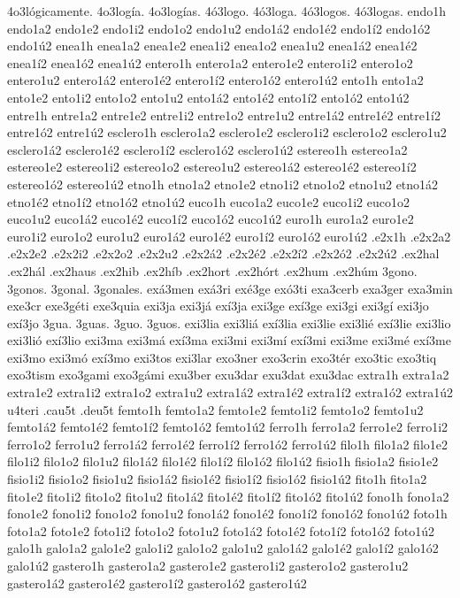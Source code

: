 {4o3lógicamente.
4o3logía.
4o3logías.
4ó3logo.
4ó3loga.
4ó3logos.
4ó3logas.
endo1h
endo1a2 endo1e2 endo1i2 endo1o2 endo1u2
endo1á2 endo1é2 endo1í2 endo1ó2 endo1ú2
enea1h
enea1a2 enea1e2 enea1i2 enea1o2 enea1u2
enea1á2 enea1é2 enea1í2 enea1ó2 enea1ú2
entero1h
entero1a2 entero1e2 entero1i2 entero1o2 entero1u2
entero1á2 entero1é2 entero1í2 entero1ó2 entero1ú2
ento1h
ento1a2 ento1e2 ento1i2 ento1o2 ento1u2
ento1á2 ento1é2 ento1í2 ento1ó2 ento1ú2
entre1h
entre1a2 entre1e2 entre1i2 entre1o2 entre1u2
entre1á2 entre1é2 entre1í2 entre1ó2 entre1ú2
esclero1h
esclero1a2 esclero1e2 esclero1i2 esclero1o2 esclero1u2
esclero1á2 esclero1é2 esclero1í2 esclero1ó2 esclero1ú2
estereo1h
estereo1a2 estereo1e2 estereo1i2 estereo1o2 estereo1u2
estereo1á2 estereo1é2 estereo1í2 estereo1ó2 estereo1ú2
etno1h
etno1a2 etno1e2 etno1i2 etno1o2 etno1u2
etno1á2 etno1é2 etno1í2 etno1ó2 etno1ú2
euco1h
euco1a2 euco1e2 euco1i2 euco1o2 euco1u2
euco1á2 euco1é2 euco1í2 euco1ó2 euco1ú2
euro1h
euro1a2 euro1e2 euro1i2 euro1o2 euro1u2
euro1á2 euro1é2 euro1í2 euro1ó2 euro1ú2
.e2x1h
.e2x2a2 .e2x2e2 .e2x2i2 .e2x2o2 .e2x2u2
.e2x2á2 .e2x2é2 .e2x2í2 .e2x2ó2 .e2x2ú2
.ex2hal
.ex2hál
.ex2haus
.ex2hib
.ex2híb
.ex2hort
.ex2hórt
.ex2hum
.ex2húm
3gono.
3gonos.
3gonal.
3gonales.
exá3men
exá3ri
exé3ge
exó3ti
exa3cerb
exa3ger
exa3min
exe3cr
exe3géti
exe3quia
exi3ja
exi3já
exí3ja
exi3ge
exí3ge
exi3gi
exi3gí
exi3jo
exí3jo
3gua.
3guas.
3guo.
3guos.
exi3lia
exi3liá
exí3lia
exi3lie
exi3lié
exí3lie
exi3lio
exi3lió
exí3lio
exi3ma
exi3má
exí3ma
exi3mi
exi3mí
exí3mi
exi3me
exi3mé
exí3me
exi3mo
exi3mó
exí3mo
exi3tos
exi3lar
exo3ner
exo3crin
exo3tér
exo3tic
exo3tiq
exo3tism
exo3gami
exo3gámi
exu3ber
exu3dar
exu3dat
exu3dac
extra1h
extra1a2 extra1e2 extra1i2 extra1o2 extra1u2
extra1á2 extra1é2 extra1í2 extra1ó2 extra1ú2
u4teri
.cau5t
.deu5t
femto1h
femto1a2 femto1e2 femto1i2 femto1o2 femto1u2
femto1á2 femto1é2 femto1í2 femto1ó2 femto1ú2
ferro1h
ferro1a2 ferro1e2 ferro1i2 ferro1o2 ferro1u2
ferro1á2 ferro1é2 ferro1í2 ferro1ó2 ferro1ú2
filo1h
filo1a2 filo1e2 filo1i2 filo1o2 filo1u2
filo1á2 filo1é2 filo1í2 filo1ó2 filo1ú2
fisio1h
fisio1a2 fisio1e2 fisio1i2 fisio1o2 fisio1u2
fisio1á2 fisio1é2 fisio1í2 fisio1ó2 fisio1ú2
fito1h
fito1a2 fito1e2 fito1i2 fito1o2 fito1u2
fito1á2 fito1é2 fito1í2 fito1ó2 fito1ú2
fono1h
fono1a2 fono1e2 fono1i2 fono1o2 fono1u2
fono1á2 fono1é2 fono1í2 fono1ó2 fono1ú2
foto1h
foto1a2 foto1e2 foto1i2 foto1o2 foto1u2
foto1á2 foto1é2 foto1í2 foto1ó2 foto1ú2
galo1h
galo1a2 galo1e2 galo1i2 galo1o2 galo1u2
galo1á2 galo1é2 galo1í2 galo1ó2 galo1ú2
gastero1h
gastero1a2 gastero1e2 gastero1i2 gastero1o2 gastero1u2
gastero1á2 gastero1é2 gastero1í2 gastero1ó2 gastero1ú2
}
